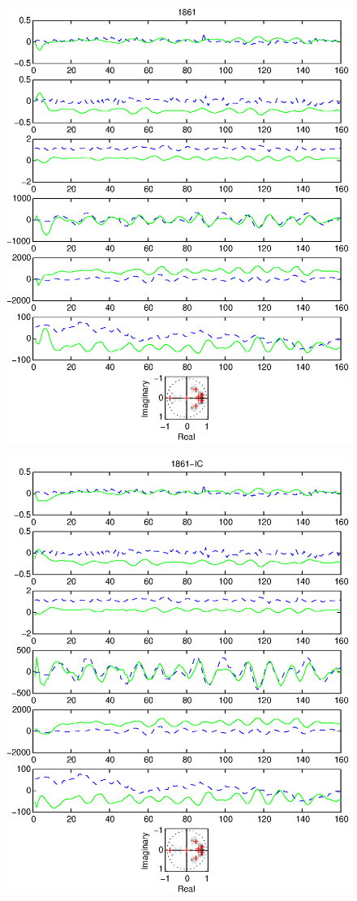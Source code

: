 \documentclass{article}
\begin{document}
\begin{figure}[htb!]
\centering
\includegraphics{1861.eps}
\end{figure}\clearpage
\begin{figure}[htb!]\centering
\includegraphics{1861_ic.eps}
\end{figure}\clearpage
\end{document}
